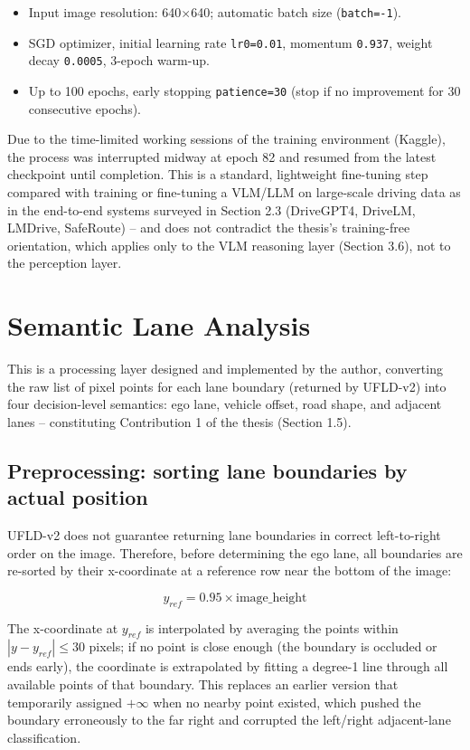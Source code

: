 \documentclass[12pt,a4paper]{report}
\begin{document}
\begin{itemize}
    \item Input image resolution: 640$\times$640; automatic batch size (\texttt{batch=-1}).
    \item SGD optimizer, initial learning rate \texttt{lr0=0.01}, momentum \texttt{0.937}, weight decay \texttt{0.0005}, 3-epoch warm-up.
    \item Up to 100 epochs, early stopping \texttt{patience=30} (stop if no improvement for 30 consecutive epochs).
\end{itemize}

Due to the time-limited working sessions of the training environment (Kaggle), the process was interrupted midway at epoch 82 and resumed from the latest checkpoint until completion. This is a standard, lightweight fine-tuning step compared with training or fine-tuning a VLM/LLM on large-scale driving data as in the end-to-end systems surveyed in Section 2.3 (DriveGPT4, DriveLM, LMDrive, SafeRoute) -- and does not contradict the thesis's training-free orientation, which applies only to the VLM reasoning layer (Section 3.6), not to the perception layer.

\section{Semantic Lane Analysis}

This is a processing layer designed and implemented by the author, converting the raw list of pixel points for each lane boundary (returned by UFLD-v2) into four decision-level semantics: ego lane, vehicle offset, road shape, and adjacent lanes -- constituting Contribution 1 of the thesis (Section 1.5).

\subsection{Preprocessing: sorting lane boundaries by actual position}

UFLD-v2 does not guarantee returning lane boundaries in correct left-to-right order on the image. Therefore, before determining the ego lane, all boundaries are re-sorted by their x-coordinate at a reference row near the bottom of the image:

\[
y_{ref} = 0.95 \times \text{image\_height}
\]

The x-coordinate at $y_{ref}$ is interpolated by averaging the points within $|y - y_{ref}| \le 30$ pixels; if no point is close enough (the boundary is occluded or ends early), the coordinate is extrapolated by fitting a degree-1 line through all available points of that boundary. This replaces an earlier version that temporarily assigned $+\infty$ when no nearby point existed, which pushed the boundary erroneously to the far right and corrupted the left/right adjacent-lane classification.
\end{document}
